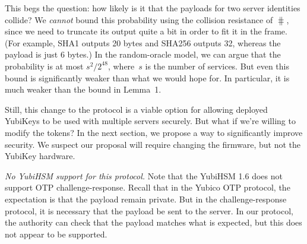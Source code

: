This begs the question: how likely is it that the payloads for two server
identities collide? We \emph{cannot} bound this probability using the collision
resistance of $\hash$, since we need to truncate its output quite a bit in order
to fit it in the frame. (For example, SHA1 outputs 20 bytes and SHA256 outputs
32, whereas the payload is just 6 bytes.)
%
In the random-oracle model, we can argue that the probability is at most
$s^2/2^{48}$, where~$s$ is the number of services. But even this bound is
significantly weaker than what we would hope for. In particular, it is much
weaker than the bound in Lemma~1.

Still, this change to the protocol is a viable option for allowing deployed
YubiKeys to be used with multiple servers securely. But what if we're willing to
modify the tokens? In the next section, we propose a way to significantly
improve security. We suspect our proposal will require changing the firmware,
but not the YubiKey hardware.

\textit{No YubiHSM support for this protocol.}
Note that the YubiHSM 1.6 does not support OTP challenge-response.  Recall that
in the Yubico OTP protocol, the expectation is that the payload remain private.
But in the challenge-response protocol, it is necessary that the payload be sent
to the server. In our protocol, the authority can check that the payload matches
what is expected, but this does not appear to be supported.
%
